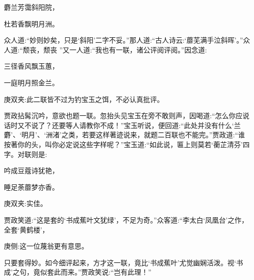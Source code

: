 \begin{poem}
    \begin{pl}    麝兰芳霭斜阳院，\end{pl}

    \begin{pl}    杜若香飘明月洲。\end{pl}
\end{poem}


\begin{parag}
    众人道:“妙则妙矣，只是‘斜阳’二字不妥。”那人道:“古人诗云:‘蘼芜满手泣斜晖’。”众人道:“颓丧，颓丧 ”又一人道:“我也有一联，诸公评阅评阅。”因念道:
\end{parag}


\begin{poem}
    \begin{pl}三径香风飘玉蕙，\end{pl}

    \begin{pl}一庭明月照金兰。\end{pl}
    \begin{note}庚双夹:此二联皆不过为钓宝玉之饵，不必认真批评。\end{note}
\end{poem}


\begin{parag}
    贾政拈髯沉吟，意欲也题一联。忽抬头见宝玉在旁不敢则声，因喝道:“怎么你应说话时又不说了？还要等人请教你不成！”宝玉听说，便回道:“此处并没有什么‘兰麝’、‘明月’、‘洲渚’之类，若要这样著迹说来，就题二百联也不能完。”贾政道:“谁按著你的头，叫你必定说这些字样呢？”宝玉道:“如此说，匾上则莫若‘蘅芷清芬’四字。对联则是:
\end{parag}


\begin{poem}
    \begin{pl}吟成豆蔻诗犹艳，\end{pl}
    \begin{pl}睡足荼蘼梦亦香。\end{pl}\begin{note}庚双夹:实佳。\end{note}
\end{poem}


\begin{parag}
    贾政笑道:“这是套的‘书成蕉叶文犹绿’，不足为奇。”众客道:“李太白‘凤凰台’之作，全套‘黄鹤楼’，\begin{note}庚侧:这一位蔑翁更有意思。\end{note}只要套得妙。如今细评起来，方才这一联，竟比‘书成蕉叶’尤觉幽娴活泼。视‘书成’之句，竟似套此而来。”贾政笑说:“岂有此理！”
\end{parag}


